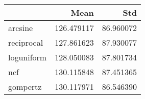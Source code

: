 \begin{tabular}{lrr}
\toprule
{} &        Mean &        Std \\
\midrule
arcsine    &  126.479117 &  86.960072 \\
reciprocal &  127.861623 &  87.930077 \\
loguniform &  128.050083 &  87.801734 \\
ncf        &  130.115848 &  87.451365 \\
gompertz   &  130.117971 &  86.546390 \\
\bottomrule
\end{tabular}
